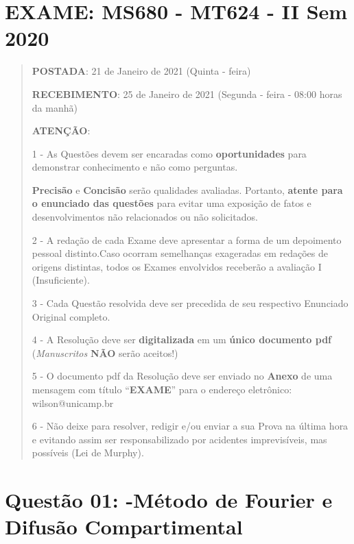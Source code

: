 
\chapter*{EXAME: MS680 - MT624 - II Sem 2020}

\begin{quote}
\textbf{POSTADA}: 21 de Janeiro de 2021 (Quinta - feira)

\textbf{RECEBIMENTO}: 25 de Janeiro de 2021 (Segunda - feira - 08:00 horas da manhã)

\textbf{ATENÇÃO}:

\begin{description}
\item 1 - As Questões devem ser encaradas como \textbf{oportunidades} para demonstrar conhecimento e não como perguntas.

\textbf{Precisão} e \textbf{Concisão} serão qualidades avaliadas. Portanto, \textbf{atente para o enunciado das questões} para evitar uma exposição de fatos e desenvolvimentos não relacionados ou não solicitados.

\item 2 - A redação de cada Exame deve apresentar a forma de um depoimento pessoal distinto.Caso ocorram semelhanças exageradas em redações de origens distintas, todos os Exames envolvidos receberão a avaliação I (Insuficiente).

\item 3 - Cada Questão resolvida deve ser precedida de seu respectivo Enunciado Original completo.

\item 4 - A Resolução deve ser \textbf{digitalizada} em um \textbf{único documento pdf} (\textit{Manuscritos} \textbf{NÃO} serão aceitos!)

\item 5 - O documento pdf da Resolução deve ser enviado no \textbf{Anexo} de uma mensagem com título ``\textbf{EXAME}'' para o endereço eletrônico: wilson@unicamp.br

\item 6 - Não deixe para resolver, redigir e/ou enviar a sua Prova na última hora e evitando assim ser responsabilizado por acidentes imprevisíveis, mas possíveis (Lei de Murphy).
\end{description}
\end{quote}



\clearpage
\chapter*{Questão 01: -Método de Fourier e Difusão Compartimental}



